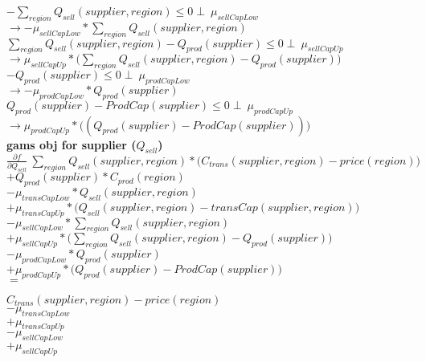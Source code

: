\documentclass{article}
\begin{document}
	\( - \sum_{region} Q_{sell}(supplier, region)  \leq 0  \perp\: \mu_{sellCapLow}\)\\
	$\rightarrow -\mu_{sellCapLow} * \sum_{region} Q_{sell}(supplier, region)$\\
	\(\sum_{region} Q_{sell}(supplier, region) -  Q_{prod}(supplier)\leq 0  \perp\: \mu_{sellCapUp}\)\\
	$\rightarrow	 \mu_{sellCapUp}*\Big(\sum_{region} Q_{sell}(supplier, region) -  Q_{prod}(supplier) \Big)$\\

	\( - Q_{prod}(supplier) \leq 0 \perp\: \mu_{prodCapLow}\)\\
	$\rightarrow	- \mu_{prodCapLow} * Q_{prod}(supplier)$\\
	\(Q_{prod}(supplier) - ProdCap(supplier) \leq 0 \perp\: \mu_{prodCapUp}\)\\
	$\rightarrow \mu_{prodCapUp}*\Big((Q_{prod}(supplier) - ProdCap(supplier))\Big)	$\\


	



\textbf{gams obj for supplier ($Q_{sell}$)}\\
$\frac{\partial f}{\partial Q_{sell}} \:\sum_{region} Q_{sell}(supplier, region) *\Big(C_{trans}(supplier,region) - price(region)\Big)$\\
$+ Q_{prod}(supplier)*C_{prod}(region)$\\
$-\mu_{transCapLow} * Q_{sell}(supplier, region)$\\
$+\mu_{transCapUp} *\Big( Q_{sell}(supplier, region) - transCap(supplier, region)\Big)$\\
$-\mu_{sellCapLow} * \sum_{region} Q_{sell}(supplier, region)$\\
$+\mu_{sellCapUp}*\Big(\sum_{region} Q_{sell}(supplier, region) -  Q_{prod}(supplier) \Big) $\\
$-\mu_{prodCapLow} * Q_{prod}(supplier)$\\
$+\mu_{prodCapUp}*\Big(Q_{prod}(supplier) - ProdCap(supplier)\Big)$\\

$=$

$C_{trans}(supplier,region) - price(region)$\\
$-\mu_{transCapLow}$\\
$+\mu_{transCapUp} $\\
$-\mu_{sellCapLow} $\\
$+\mu_{sellCapUp} $\\
\end{document}
